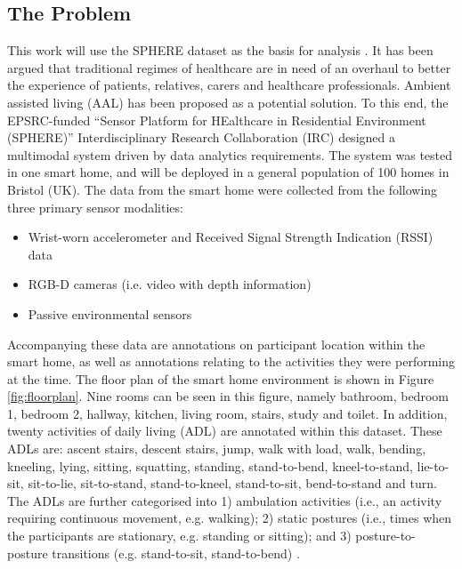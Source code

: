 \documentclass[fleqn,10pt]{SelfArx} %
\begin{document}
	\subsection{The Problem}
This work will use the SPHERE dataset \cite{sphere2016} as the basis for analysis . It has been argued that traditional regimes of healthcare are in need of an overhaul to better the experience of patients, relatives, carers and healthcare professionals. Ambient assisted living (AAL) has been proposed as a potential solution. To this end, the EPSRC-funded “Sensor Platform for HEalthcare in Residential Environment (SPHERE)” Interdisciplinary Research Collaboration (IRC) \cite{sphere2015} designed a multimodal system driven by data analytics requirements. The system was tested in one smart home, and will be deployed in a general population of 100 homes in Bristol (UK). The data from the smart home were collected from the following three primary sensor modalities:
\begin{itemize}
\item Wrist-worn accelerometer and Received Signal Strength Indication (RSSI) data
\item RGB-D cameras (i.e. video with depth information)
\item Passive environmental sensors
\end{itemize}
Accompanying these data are annotations on participant location within the smart home, as well as annotations relating to the activities they were performing at the time. The floor plan of the smart home environment is shown in Figure \ref{fig:floorplan}. Nine rooms can be seen in this figure, namely bathroom, bedroom 1, bedroom 2, hallway, kitchen, living room, stairs, study and toilet. In addition, twenty activities of daily living (ADL) are annotated within this dataset. These ADLs are: ascent stairs, descent stairs, jump, walk with load, walk, bending, kneeling, lying, sitting, squatting, standing, stand-to-bend, kneel-to-stand, lie-to-sit, sit-to-lie, sit-to-stand, stand-to-kneel, stand-to-sit, bend-to-stand and turn. The ADLs are further categorised into 1) ambulation activities (i.e., an activity requiring continuous movement, e.g. walking); 2) static postures (i.e., times when the participants are stationary, e.g. standing or sitting); and 3) posture-to-posture transitions (e.g. stand-to-sit, stand-to-bend) \cite{sphere2017}.  \\
\end{document}
